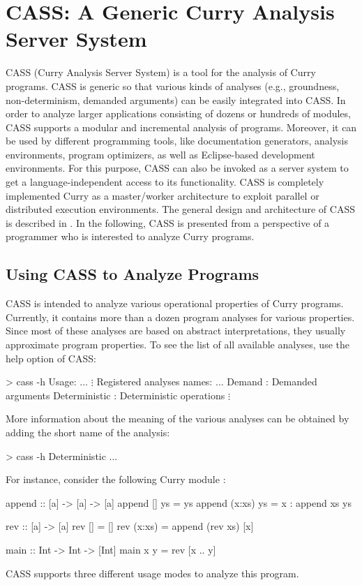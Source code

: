 \section{CASS: A Generic Curry Analysis Server System}
\label{sec-cass}

CASS
(Curry Analysis Server System)
is a tool for the analysis of Curry programs.
CASS is generic so that various kinds of analyses (e.g., groundness,
non-determinism, demanded arguments) can be easily integrated into CASS.
In order to analyze larger applications consisting of dozens or hundreds
of modules, CASS supports a modular and incremental analysis of
programs. Moreover, it can be used by different programming tools,
like documentation generators, analysis environments, program
optimizers, as well as Eclipse-based development environments. For
this purpose, CASS can also be invoked as a server system to get a
language-independent access to its functionality. CASS is completely
implemented Curry as a master/worker architecture to exploit parallel
or distributed execution environments.
The general design and architecture of CASS is described
in \cite{HanusSkrlac14}.
In the following, CASS is presented from a perspective
of a programmer who is interested to analyze Curry programs.

\subsection{Using CASS to Analyze Programs}

CASS is intended to analyze various operational properties
of Curry programs. Currently, it contains more than a dozen
program analyses for various properties.
Since most of these analyses are based on abstract interpretations,
they usually approximate program properties.
To see the list of all available analyses, use the help option of CASS:
\begin{curry}
> cass -h
Usage: $\ldots$
$\vdots$
Registered analyses names:
$\ldots$
Demand          : Demanded arguments
Deterministic   : Deterministic operations
$\vdots$
\end{curry}
More information about the meaning of the various analyses
can be obtained by adding the short name of the analysis:
\begin{curry}
> cass -h Deterministic
$\ldots$
\end{curry}
For instance, consider the following Curry module :
\begin{curry}
append :: [a] -> [a] -> [a]
append []     ys = ys
append (x:xs) ys = x : append xs ys

rev :: [a] -> [a]
rev []     = []
rev (x:xs) = append (rev xs) [x]

main :: Int -> Int -> [Int]
main x y = rev [x .. y]
\end{curry}
%
CASS supports three different usage modes to analyze this program.

